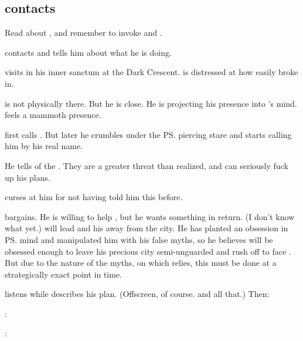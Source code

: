 \subsection{\Ishnaruchaefir contacts \Secherdamon}
Read about , and remember to invoke \Sethicus and \Tiamat. 

\Ishnaruchaefir{} contacts \Secherdamon{} and tells him about what he is doing. 

\Ishnaruchaefir visits {\LocarPsyrex} in his inner sanctum at the Dark Crescent. 
\Psyrex is distressed at how easily \Ishnaruchaefir broke in. 

\Ishnaruchaefir is not physically there. 
But he is close.
He is projecting his presence into \Psyrex's mind. 
\Psyrex feels a mammoth presence.

\Psyrex first calls \Ishnaruchaefir {}. 
But later he crumbles under the \ps{\dragonlord} piercing stare and starts calling him by his real name. 

He tells \Psyrex{} of the . 
They are a greater threat than \Psyrex{} realized, and can seriously fuck up his plans. 

\Psyrex{} curses at him for not having told him this before.

\Ishnaruchaefir{} bargains. 
He is willing to help \Psyrex, but he wants something in return. 
(I don't know what yet.) 
\Ishnaruchaefir{} will lead \Teshrial{} and his \noggyaleth{} away from the city. 
He has planted an obsession in \ps{\Teshrial} mind and manipulated him with his false myths, so he believes \Teshrial{} will be obsessed enough to leave his precious city semi-unguarded and rush off to face \Ishnaruchaefir. 
But due to the nature of the myths, on which \Teshrial{} relies, this must be done at a strategically exact point in time. 

\Psyrex{} listens while \Ishnaruchaefir{} describes his plan. 
(Offscreen, of course. 
  and all that.)
Then:
\begin{prose}
  \Psyrex:  
  
  \Ishnaruchaefir: 
\end{prose}

